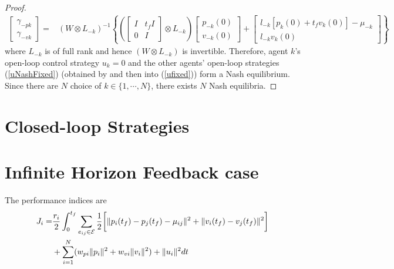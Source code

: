 \documentclass[12pt,draftcls,onecolumn]{IEEEtran}  %
\begin{document}
{\begin{proof}
\begin{align}
\begin{bmatrix}
\gamma_{-pk}\\
\gamma_{-vk}
\end{bmatrix}=&\left(W\otimes L_{-k}\right)^{-1}\left\{\left(\begin{bmatrix}
I&t_fI\\
0&I
\end{bmatrix}\otimes L_{-k}\right)\begin{bmatrix}
p_{-k}(0)\\
v_{-k}(0)
\end{bmatrix}+\begin{bmatrix}
l_{-k}[p_k(0)+t_fv_k(0)]-\mu_{-k}\\
l_{-k}v_k(0)
\end{bmatrix}\right\}\label{gammaminuskfixed}
\end{align}
where $L_{-k}$ is of full rank and hence $(W\otimes L_{-k})$ is invertible. Therefore, agent $k$'s open-loop control strategy $u_k=0$ and the other agents' open-loop strategies (\ref{uNashFixed}) (obtained by and then into (\ref{ufixed})) form a Nash equilibrium. Since there are $N$ choice of $k\in\{1,\cdots,N\}$, there exists $N$ Nash equilibria.
\end{proof}
\section{Closed-loop Strategies}


\section{Infinite Horizon Feedback case}
The performance indices are
\begin{align}
J_i=&\frac{r_i}{2}\int^{t_f}_0 \sum_{e_{ij}\in\mathcal{E}} \frac{1}{2}\bigg[\|p_i(t_f)-p_j(t_f)-\mu_{ij}\|^2+ \|v_i(t_f)-v_j(t_f)\|^2\bigg]\notag\\
&+\sum_{i=1}^{N}(w_{pi} \|p_i\|^2+w_{vi}\|v_i\|^2)+\|u_i\|^2  \mbox{d}t
\end{align}

}
\end{document}
